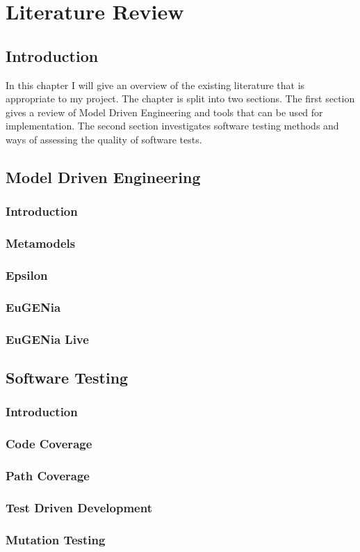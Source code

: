 \chapter{Literature Review}

\section{Introduction}
In this chapter I will give an overview of the existing literature that is appropriate to my project. The chapter is split into two sections. The first section gives a review of Model Driven Engineering and tools that can be used for implementation. The second section investigates software testing methods and ways of assessing the quality of software tests.

\section{Model Driven Engineering}
\subsection{Introduction}
\subsection{Metamodels}
\subsection{Epsilon}
\subsection{EuGENia}
\subsection{EuGENia Live}

\section{Software Testing}
\subsection{Introduction}
\subsection{Code Coverage}
\subsection{Path Coverage}
\subsection{Test Driven Development}
\subsection{Mutation Testing}

